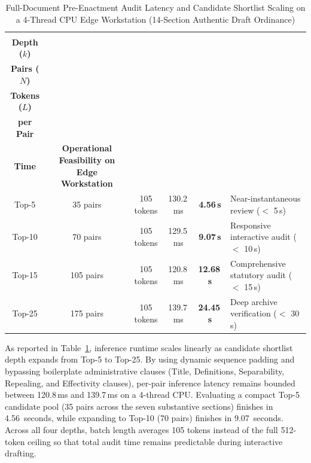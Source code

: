 \begin{table}[htbp]
    \centering
    \footnotesize
    \setlength{\tabcolsep}{4.0pt}
    \renewcommand{\arraystretch}{0.84}
    \caption[Full-Document Audit Latency and Candidate Scaling on 4-Thread CPU]{Full-Document Pre-Enactment Audit Latency and Candidate Shortlist Scaling on a 4-Thread CPU Edge Workstation (14-Section Authentic Draft Ordinance)}
    \label{tab:audit_latency_scaling}
    \begin{tabularx}{\linewidth}{ccccc>{\RaggedRight\arraybackslash}X}
        \toprule
        \shortstack[c]{\textbf{Shortlist}\\\textbf{Depth ($k$)}} & \shortstack[c]{\textbf{Evaluated}\\\textbf{Pairs ($N$)}} & \shortstack[c]{\textbf{Batch}\\\textbf{Tokens ($L$)}} & \shortstack[c]{\textbf{Mean Latency}\\\textbf{per Pair}} & \shortstack[c]{\textbf{Audit}\\\textbf{Time}} & \textbf{Operational Feasibility on Edge Workstation} \\
        \midrule
        Top-5  & 35 pairs  & 105 tokens & 130.2\,ms & \textbf{4.56\,s}  & Near-instantaneous review ($<$ 5\,s) \\
        Top-10 & 70 pairs  & 105 tokens & 129.5\,ms & \textbf{9.07\,s}  & Responsive interactive audit ($<$ 10\,s) \\
        Top-15 & 105 pairs & 105 tokens & 120.8\,ms & \textbf{12.68\,s} & Comprehensive statutory audit ($<$ 15\,s) \\
        Top-25 & 175 pairs & 105 tokens & 139.7\,ms & \textbf{24.45\,s} & Deep archive verification ($<$ 30\,s) \\
        \bottomrule
    \end{tabularx}
\end{table}

As reported in Table~\ref{tab:audit_latency_scaling}, inference runtime scales linearly as candidate shortlist depth expands from Top-5 to Top-25. By using dynamic sequence padding and bypassing boilerplate administrative clauses (Title, Definitions, Separability, Repealing, and Effectivity clauses), per-pair inference latency remains bounded between 120.8\,ms and 139.7\,ms on a 4-thread CPU. Evaluating a compact Top-5 candidate pool (35 pairs across the seven substantive sections) finishes in 4.56~seconds, while expanding to Top-10 (70 pairs) finishes in 9.07~seconds. Across all four depths, batch length averages 105 tokens instead of the full 512-token ceiling so that total audit time remains predictable during interactive drafting.

